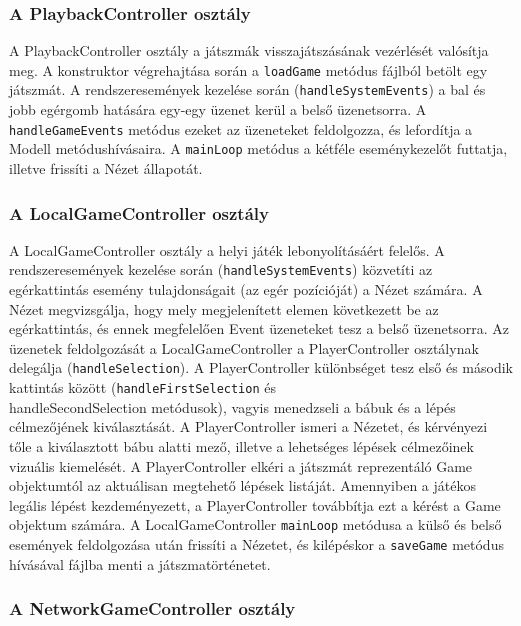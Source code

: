 \documentclass[12pt, twoside]{report}
\begin{document}
\subsubsection{A PlaybackController osztály}

A PlaybackController osztály a játszmák visszajátszásának vezérlését valósítja meg. A konstruktor végrehajtása során a {\tt loadGame} metódus fájlból betölt egy játszmát. A rendszeresemények kezelése során ({\tt handleSystemEvents}) a bal és jobb egérgomb hatására egy-egy üzenet kerül a belső üzenetsorra. A {\tt handleGameEvents} metódus ezeket az üzeneteket feldolgozza, és lefordítja a Modell metódushívásaira. A {\tt mainLoop} metódus a kétféle eseménykezelőt futtatja, illetve frissíti a Nézet állapotát.

\subsubsection{A LocalGameController osztály}

A LocalGameController osztály a helyi játék lebonyolításáért felelős. A rendszeresemények kezelése során ({\tt handleSystemEvents}) közvetíti az egérkattintás esemény tulajdonságait (az egér pozícióját) a Nézet számára. A Nézet megvizsgálja, hogy mely megjelenített elemen következett be az egérkattintás, és ennek megfelelően Event üzeneteket tesz a belső üzenetsorra. Az üzenetek feldolgozását a LocalGameController a PlayerController osztálynak delegálja ({\tt handleSelection}). A PlayerController különbséget tesz első és második kattintás között ({\tt handleFirstSelection} és {\\handleSecondSelection} metódusok), vagyis menedzseli a bábuk és a lépés célmezőjének kiválasztását. A PlayerController ismeri a Nézetet, és kérvényezi tőle a kiválasztott bábu alatti mező, illetve a lehetséges lépések célmezőinek vizuális kiemelését. A PlayerController elkéri a játszmát reprezentáló Game objektumtól az aktuálisan megtehető lépések listáját. Amennyiben a játékos legális lépést kezdeményezett, a PlayerController továbbítja ezt a kérést a Game objektum számára. A LocalGameController {\tt mainLoop} metódusa a külső és belső események feldolgozása után frissíti a Nézetet, és kilépéskor a {\tt saveGame} metódus hívásával fájlba menti a játszmatörténetet.

\subsubsection{A NetworkGameController osztály}
\end{document}
